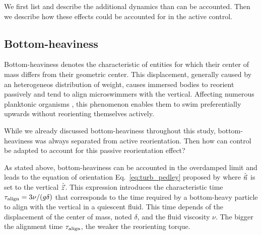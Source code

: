 We first list and describe the additional dynamics than can be accounted.
Then we describe how these effects could be accounted for in the active control.

\subsection{Bottom-heaviness}\label{sec:add_bh}

Bottom-heaviness denotes the characteristic of entities for which their center of mass differs from their geometric center.
This displacement, generally caused by an heterogeneos distribution of weight, causes immersed bodies to reorient passively and tend to align microswimmers with the vertical.
Affecting numerous planktonic organisms \citep{wheeler2019not, chan2012biomechanics, mogami2001theoretical}, this phenomenon enables them to swim preferentially upwards without reorienting themselves actively.

While we already discussed bottom-heaviness throughout this study, bottom-heaviness was always separated from active reorientation.
Then how can control be adapted to account for this passive reorientation effect?

As stated above, bottom-heaviness can be accounted in the overdamped limit and leads to the equation of orientation Eq.~\eqref{eq:turb_pedley} proposed by \citet{Pedley1992} where $\hat{\vec{n}}$ is set to the vertical $\hat{\vec{z}}$.
This expression introduces the characteristic time $\tau_{\mathrm{align}} = 3 \nu / (g \delta)$ that corresponds to the time required by a bottom-heavy particle to align with the vertical in a quiescent fluid.
This time depends of the displacement of the center of mass, noted $\delta$, and the fluid viscosity $\nu$.
The bigger the alignment time $\tau_{\mathrm{align}}$, the weaker the reorienting torque.

